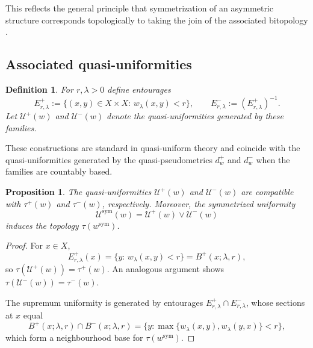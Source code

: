 \documentclass[preprint,12pt]{elsarticle}
\newtheorem{proposition}[theorem]{Proposition}
\newtheorem{definition}[theorem]{Definition}
\begin{document}
\noindent
This reflects the general principle that symmetrization of an asymmetric
structure corresponds topologically to taking the join of the associated
bitopology \cite{Kunzi2001,Majozi2025}.

\subsection{Associated quasi-uniformities}\label{ssec:quni}

\begin{definition}
\label{def:quni-from-w}
For $r,\lambda>0$ define entourages
\[
E^{+}_{r,\lambda}
:=\{(x,y)\in X\times X:\, w_\lambda(x,y)<r\},
\qquad
E^{-}_{r,\lambda}:=(E^{+}_{r,\lambda})^{-1}.
\]
Let $\mathcal U^{+}(w)$ and $\mathcal U^{-}(w)$ denote the quasi-uniformities
generated by these families.
\end{definition}

\noindent
These constructions are standard in quasi-uniform theory
\cite{FletcherLindgren,Kunzi2001} and coincide with the quasi-uniformities
generated by the quasi-pseudometrics $d_w^{+}$ and $d_w^{-}$ when the
families are countably based.


\begin{proposition}
\label{prop:compatibility-generation}
The quasi-uniformities $\mathcal U^{+}(w)$ and $\mathcal U^{-}(w)$ are
compatible with $\tau^{+}(w)$ and $\tau^{-}(w)$, respectively.
Moreover, the symmetrized uniformity
\[
\mathcal U^{\mathrm{sym}}(w)
=
\mathcal U^{+}(w)\vee\mathcal U^{-}(w)
\]
induces the topology $\tau(w^{\mathrm{sym}})$.
\end{proposition}

\begin{proof}
For $x\in X$,
\[
E^{+}_{r,\lambda}(x)
=
\{y:\, w_\lambda(x,y)<r\}
=
B^{+}(x;\lambda,r),
\]
so $\tau(\mathcal U^{+}(w))=\tau^{+}(w)$.
An analogous argument shows $\tau(\mathcal U^{-}(w))=\tau^{-}(w)$.

The supremum uniformity is generated by entourages
$E^{+}_{r,\lambda}\cap E^{-}_{r,\lambda}$, whose sections at $x$ equal
\[
B^{+}(x;\lambda,r)\cap B^{-}(x;\lambda,r)
=
\{y:\max\{w_\lambda(x,y),w_\lambda(y,x)\}<r\},
\]
which form a neighbourhood base for $\tau(w^{\mathrm{sym}})$.
\end{proof}
\end{document}
